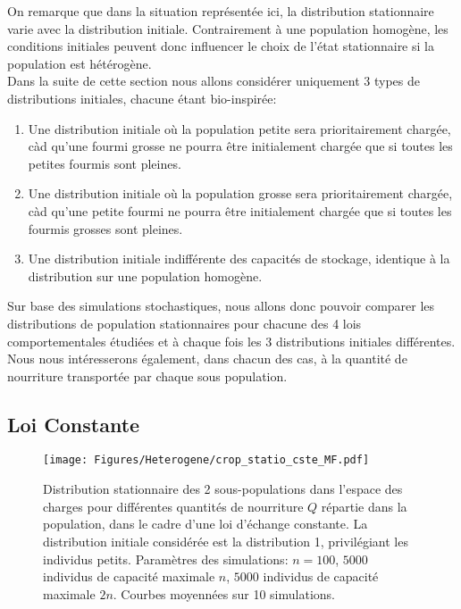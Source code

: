 On remarque que dans la situation représentée ici, la distribution stationnaire varie avec la distribution initiale. Contrairement à une population homogène, les conditions initiales peuvent donc influencer le choix de l'état stationnaire si la population est hétérogène.\\

Dans la suite de cette section nous allons considérer uniquement 3 types de distributions initiales, chacune étant bio-inspirée:
\begin{enumerate}
\item Une distribution initiale où la population petite sera prioritairement chargée, càd qu'une fourmi grosse ne pourra être initialement chargée que si toutes les petites fourmis sont pleines.
\item Une distribution initiale où la population grosse sera prioritairement chargée, càd qu'une petite fourmi ne pourra être initialement chargée que si toutes les fourmis grosses sont pleines.
\item Une distribution initiale indifférente des capacités de stockage, identique à la distribution sur une population homogène.
\end{enumerate}


Sur base des simulations stochastiques, nous allons donc pouvoir comparer les distributions de population stationnaires pour chacune des 4 lois comportementales étudiées et à chaque fois les 3 distributions initiales différentes. Nous nous intéresserons également, dans chacun des cas, à la quantité de nourriture transportée par chaque sous population.

\pagebreak
\subsection{Loi Constante}


\begin{figure}[h!]
\centering
\texttt{[image: Figures/Heterogene/crop\_statio\_cste\_MF.pdf]}
\caption{Distribution stationnaire des 2 sous-populations dans l'espace des charges pour différentes quantités de nourriture $Q$ répartie dans la population, dans le cadre d'une loi d'échange constante. La distribution initiale considérée est la distribution 1, privilégiant les individus petits. Paramètres des simulations: $n=100$, $5000$ individus de capacité maximale $n$, $5000$ individus de capacité maximale $2n$. Courbes moyennées sur 10 simulations.}
\label{statio_cste_MF}
\end{figure}

